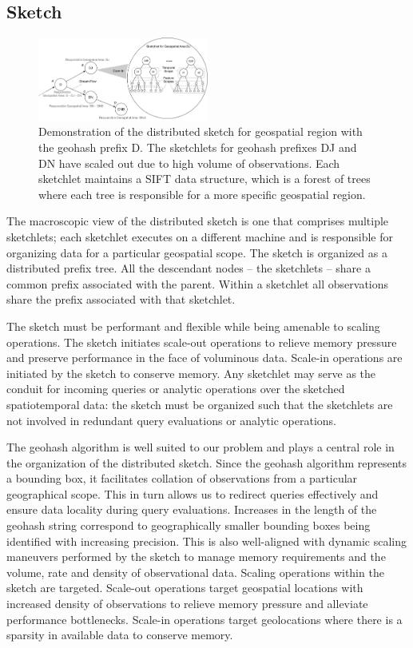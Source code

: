 \subsection{Sketch}
\begin{figure}
    \centerline{\includegraphics[width=0.5\textwidth]{figures/dist-sketch.pdf}}
    \caption{Demonstration of the distributed sketch for geospatial region with the geohash prefix D. The sketchlets for geohash prefixes DJ and DN have scaled out due to high volume of observations. Each sketchlet maintains a SIFT data structure, which is a forest of trees where each tree is responsible for a more specific geospatial region.}
    \label{fig:dist-sketch}
\end{figure}

The macroscopic view of the distributed sketch is one that comprises multiple sketchlets; each sketchlet executes on a different machine and is responsible for organizing data for a particular geospatial scope. The sketch is organized as a distributed prefix tree. All the descendant nodes -- the sketchlets -- share a common prefix associated with the parent. Within a sketchlet all observations share the prefix associated with that sketchlet.

The sketch must be performant and flexible while being amenable to scaling operations. The sketch initiates scale-out operations to relieve memory pressure and preserve performance in the face of voluminous data. Scale-in operations are initiated by the sketch to conserve memory. Any sketchlet may serve as the conduit for incoming queries or analytic operations over the sketched spatiotemporal data: the sketch must be organized such that the sketchlets are not involved in redundant query evaluations or analytic operations. 

The geohash algorithm is well suited to our problem and plays a central role in the organization of the distributed sketch. Since the geohash algorithm represents a bounding box, it facilitates collation of observations from a particular geographical scope. This in turn allows us to redirect queries effectively and ensure data locality during query evaluations. Increases in the length of the geohash string correspond to geographically smaller bounding boxes being identified with increasing precision. This is also well-aligned with dynamic scaling maneuvers performed by the sketch to manage memory requirements and the volume, rate and density of observational data. Scaling operations within the sketch are targeted. Scale-out operations target geospatial locations with increased density of observations to relieve memory pressure and alleviate performance bottlenecks. Scale-in operations target geolocations where there is a sparsity in available data to conserve memory.

